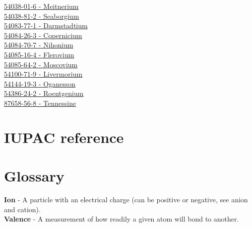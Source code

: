 \documentclass{book}
\begin{document}
\begin{multicols}{2}
\hyperref[sec:elem-meitnerium]{54038-01-6 - Meitnerium}\\
\hyperref[sec:elem-seaborgium]{54038-81-2 - Seaborgium}\\
\hyperref[sec:elem-darmstadtium]{54083-77-1 - Darmstadtium}\\
\hyperref[sec:elem-copernicium]{54084-26-3 - Copernicium}\\
\hyperref[sec:elem-nihonium]{54084-70-7 - Nihonium}\\
\hyperref[sec:elem-flerovium]{54085-16-4 - Flerovium}\\
\hyperref[sec:elem-moscovium]{54085-64-2 - Moscovium}\\
\hyperref[sec:elem-livermorium]{54100-71-9 - Livermorium}\\
\hyperref[sec:elem-oganesson]{54144-19-3 - Oganesson}\\
\hyperref[sec:elem-roentgenium]{54386-24-2 - Roentgenium}\\
\hyperref[sec:elem-tennessine]{87658-56-8 - Tennessine}\\
\end{multicols}

\chapter{IUPAC reference}

\chapter{Glossary}
\textbf{Ion} - A particle with an electrical charge (can be positive or negative, see anion and cation).\\
\textbf{Valence} - A measurement of how readily a given atom will bond to another.\\
\end{document}
